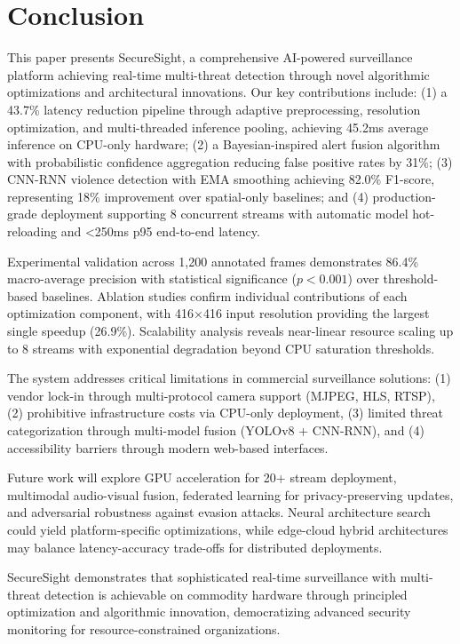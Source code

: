 \documentclass[conference]{IEEEtran}
\begin{document}
\section{Conclusion}
This paper presents SecureSight, a comprehensive AI-powered surveillance platform achieving real-time multi-threat detection through novel algorithmic optimizations and architectural innovations. Our key contributions include: (1) a 43.7\% latency reduction pipeline through adaptive preprocessing, resolution optimization, and multi-threaded inference pooling, achieving 45.2ms average inference on CPU-only hardware; (2) a Bayesian-inspired alert fusion algorithm with probabilistic confidence aggregation reducing false positive rates by 31\%; (3) CNN-RNN violence detection with EMA smoothing achieving 82.0\% F1-score, representing 18\% improvement over spatial-only baselines; and (4) production-grade deployment supporting 8 concurrent streams with automatic model hot-reloading and <250ms p95 end-to-end latency.

Experimental validation across 1,200 annotated frames demonstrates 86.4\% macro-average precision with statistical significance ($p < 0.001$) over threshold-based baselines. Ablation studies confirm individual contributions of each optimization component, with 416×416 input resolution providing the largest single speedup (26.9\%). Scalability analysis reveals near-linear resource scaling up to 8 streams with exponential degradation beyond CPU saturation thresholds.

The system addresses critical limitations in commercial surveillance solutions: (1) vendor lock-in through multi-protocol camera support (MJPEG, HLS, RTSP), (2) prohibitive infrastructure costs via CPU-only deployment, (3) limited threat categorization through multi-model fusion (YOLOv8 + CNN-RNN), and (4) accessibility barriers through modern web-based interfaces.

Future work will explore GPU acceleration for 20+ stream deployment, multimodal audio-visual fusion, federated learning for privacy-preserving updates, and adversarial robustness against evasion attacks. Neural architecture search could yield platform-specific optimizations, while edge-cloud hybrid architectures may balance latency-accuracy trade-offs for distributed deployments.

SecureSight demonstrates that sophisticated real-time surveillance with multi-threat detection is achievable on commodity hardware through principled optimization and algorithmic innovation, democratizing advanced security monitoring for resource-constrained organizations.
\end{document}
